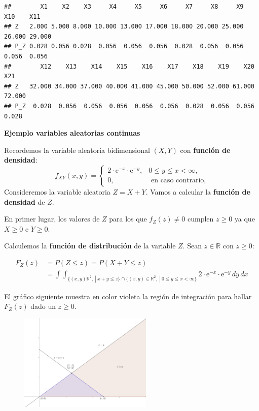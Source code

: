 \documentclass[]{book}
\begin{document}
\begin{verbatim}
##        X1    X2    X3     X4     X5     X6     X7     X8     X9    X10    X11
## Z   2.000 5.000 8.000 10.000 13.000 17.000 18.000 20.000 25.000 26.000 29.000
## P_Z 0.028 0.056 0.028  0.056  0.056  0.056  0.028  0.056  0.056  0.056  0.056
##        X12    X13    X14    X15    X16    X17    X18    X19    X20    X21
## Z   32.000 34.000 37.000 40.000 41.000 45.000 50.000 52.000 61.000 72.000
## P_Z  0.028  0.056  0.056  0.056  0.056  0.056  0.028  0.056  0.056  0.028
\end{verbatim}

\textbf{Ejemplo variables aleatorias continuas}

Recordemos la variable aleatoria bidimensional \((X,Y)\) con \textbf{función de densidad}:
\[
f_{XY}(x,y)=\begin{cases}
2\cdot  \mathrm{e}^{-x}\cdot \mathrm{e}^{-y}, & 0\leq y\leq x < \infty,\\
0, & \mbox{ en caso contrario,}
\end{cases}
\]
Consideremos la variable aleatoria \(Z=X+Y\). Vamos a calcular la \textbf{función de densidad} de \(Z\).

En primer lugar, los valores de \(Z\) para los que \(f_Z(z)\neq 0\) cumplen \(z\geq 0\) ya que \(X\geq 0\) e \(Y\geq 0\).

Calculemos la \textbf{función de distribución} de la variable \(Z\). Sean \(z\in\mathbb{R}\) con \(z\geq 0\):

\[
\begin{array}{rl}
F_Z(z) & =  P(Z\leq z)=P(X+Y\leq z)\\
& =\displaystyle \int\int_{\{(x,y)\mathbb{R}^2,\ |\ x+y\leq z\}\cap \{(x,y)\in \mathbb{R}^2,\ |\ 0\leq y\leq x<\infty\}} 2\cdot  \mathrm{e}^{-x}\cdot \mathrm{e}^{-y}\, dy\, dx
\end{array}
\]

El gráfico siguiente muestra en color violeta la región de integración para hallar \(F_Z(z)\) dado un \(z\geq 0\).

\begin{figure}
\includegraphics[width=2.5in]{Images/EjSumaXY} \end{figure}
\end{document}
